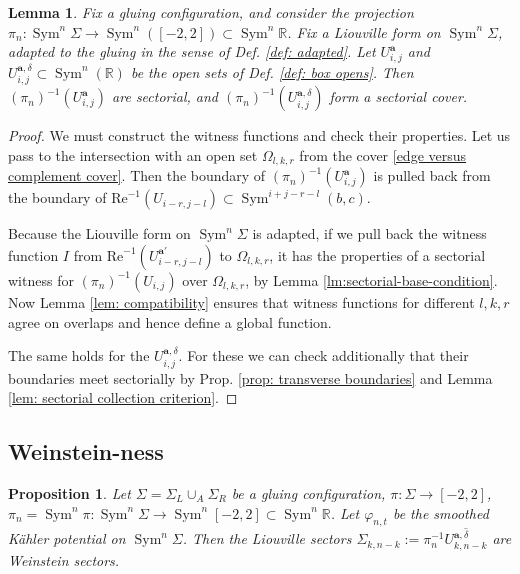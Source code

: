 \documentclass{article}
\def\R{\mathbb{R}}
\def\In{\subset}
\DeclareMathOperator{\Sym}{Sym}
\def\ba{\mathbf{a}} %
\newtheorem{lemma}[theorem]{Lemma}
\newtheorem{proposition}[theorem]{Proposition}
\theoremstyle{definition}
\begin{document}
\begin{lemma} \label{the cover}
    Fix a gluing configuration, and 
    consider the projection $\pi_n: \Sym^n \Sigma \to \Sym^n([-2,2]) \subset \Sym^n \R$.  
    Fix a Liouville form on $\Sym^n \Sigma$, adapted to the gluing in the sense of Def. \ref{def: adapted}. 
    Let $U^\ba_{i,j}$ and $U_{i,j}^{\ba,\delta} \subset \Sym^n(\R)$ be the open sets of Def. \ref{def: box opens}.  
    Then $(\pi_n)^{-1}(U^\ba_{i,j})$ are sectorial, and $(\pi_n)^{-1}(U_{i,j}^{\ba,\delta})$ form a sectorial cover.
\end{lemma}
\begin{proof}
    We must construct the witness functions and check their properties.  Let us pass to the intersection with an open set $\Omega_{l,k,r}$ from the cover \eqref{edge versus complement cover}.  Then the boundary of 
    $(\pi_n)^{-1}(U^\ba_{i,j})$ is pulled back from
    the boundary of $\mathrm{Re}^{-1}(U_{i-r, j-l}) \subset \Sym^{i+j-r-l}(b,c)$.   
    
    Because the Liouville form on $\Sym^n \Sigma$ is adapted,  if we pull back the witness function $I$ from $\mathrm{Re}^{-1}(U^{\ba'}_{i-r, j-l})$ to $\Omega_{l,k,r}$, it has the properties of a sectorial witness for $(\pi_n)^{-1}(U_{i,j})$ over $\Omega_{l,k,r}$, by Lemma \ref{lm:sectorial-base-condition}. 
    Now Lemma \ref{lem: compatibility} ensures that witness functions for different $l,k,r$ agree on overlaps and hence define a global function.  
    
    The same holds for the $U_{i,j}^{\ba,\delta}$.  For these we can check additionally that their boundaries meet sectorially   by Prop. \ref{prop: transverse boundaries} and Lemma \ref{lem: sectorial collection criterion}.
\end{proof}



\subsection{Weinstein-ness}

\begin{proposition} \label{weinstein-ness}
Let $\Sigma = \Sigma_L \cup_A \Sigma_R$ be a gluing configuration, $\pi: \Sigma \to [-2,2]$, $\pi_n = \Sym^n \pi: \Sym^n \Sigma \to \Sym^n [-2,2] \In \Sym^n \R$. Let $\varphi_{n,t}$ be the smoothed K\"ahler potential on $\Sym^n \Sigma$. Then the Liouville sectors $\Sigma_{k,n-k}:=\pi_n^{-1} \overline{U_{k,n-k}^{\ba, \delta}}$ are Weinstein sectors. 
\end{proposition}
\end{document}
